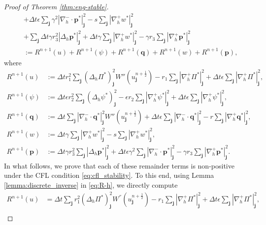 \documentclass[11pt]{article}
\numberwithin{equation}{section}
\newtheorem{counter example}[theorem]{Counter Example}
\numberwithin{equation}{section}
\numberwithin{equation}{section}
\newcommand{\half}{\frac{1}{2}}
\begin{document}
\begin{proof}[Proof of Theorem  \ref{thm:eng-stable}]
\begin{align}
&+\Delta t \epsilon\sum_{\mathbf{j}}\gamma^2|\nabla_h^- \cdot\mathbf{p}^*|_{\mathbf{j}}^2-s\sum_{\mathbf{j}}|\nabla_h^+ w^*|_{\mathbf{j}}^2\nonumber\\
&+\sum_{\mathbf{j}}\Delta t \gamma r_3^2|\Delta_h \mathbf{p}^*|_{\mathbf{j}}^2+\Delta t \gamma\sum_{\mathbf{j}}|\nabla_h^+ w^*|_{\mathbf{j}}^2 -\gamma r_3\sum_{\mathbf{j}}|\nabla_h^{+} \mathbf{p}^*|_{\mathbf{j}}^2\nonumber\\
&:=R^{n+1}(u)+R^{n+1}(\psi)+R^{n+1}(\mathbf q)+R^{n+1}(w)+R^{n+1}(\mathbf p),
\end{align}
where
\begin{align}
R^{n+1}(u)
&:=
\Delta t r_1^2\sum_{\mathbf{j}}(\Delta_h \Pi^*)_{\mathbf{j}}^2W''(u_{\mathbf{j}}^{n+\frac12})
-r_1\sum_{\mathbf{j}}|\nabla_h^+\Pi^*|_{\mathbf{j}}^2
+\Delta t\epsilon\sum_{\mathbf{j}}|\nabla_h^+\Pi^*|_{\mathbf{j}}^2,
\label{eq:R-h}
\\
R^{n+1}(\psi)
&:=
\Delta t\epsilon r_2^2\sum_{\mathbf{j}}(\Delta_h\psi^*)_{\mathbf{j}}^2
-\epsilon r_2\sum_{\mathbf{j}}|\nabla_h^+\psi^*|_{\mathbf{j}}^2
+\Delta t\epsilon\sum_{\mathbf{j}}|\nabla_h^+\psi^*|_{\mathbf{j}}^2,
\label{eq:R-psi}
\\
R^{n+1}(\mathbf q)
&:=
\Delta t\sum_{\mathbf{j}}|\nabla_h^{-}\cdot\mathbf q^*|_{\mathbf{j}}^2W''(u_{\mathbf{j}}^{n+\frac12})
+\Delta t\epsilon\sum_{\mathbf{j}}|\nabla_h^{-}\cdot\mathbf q^*|_{\mathbf{j}}^2
 -r\sum_{\mathbf{j}}|\nabla_h^{+}\mathbf q^*|_{\mathbf{j}}^2,
\label{eq:R-q}
\\
R^{n+1}(w)
&:=
\Delta t\gamma\sum_{\mathbf{j}}|\nabla_h^+w^*|_{\mathbf{j}}^2
-s\sum_{\mathbf{j}}|\nabla_h^+w^*|_{\mathbf{j}}^2,
\label{eq:R-w}
\\
R^{n+1}(\mathbf p)
&:=
\Delta t\gamma r_3^2\sum_{\mathbf{j}}|\Delta_h\mathbf p^*|_{\mathbf{j}}^2
+\Delta t\epsilon\gamma^2\sum_{\mathbf{j}}|\nabla_h^{-}\cdot\mathbf p^*|_{\mathbf{j}}^2
 -\gamma r_3\sum_{\mathbf{j}}|\nabla_h^{+}\mathbf p^*|_{\mathbf{j}}^2 .
\label{eq:R-p}
\end{align}
In what follows, we prove that each of these remainder terms is non-positive under the CFL condition \eqref{eq:cfl_stability}. To this end, using Lemma \ref{lemma:discrete_inverse} in \eqref{eq:R-h}, we directly compute
\begin{equation}
\begin{aligned}
R^{n+1}(u)&=\Delta t \sum_{\mathbf{j}} r_1^2(\Delta_h \Pi^*)_{\mathbf{j}}^2W^{''}(u_{\mathbf{j}}^{n+\half})-r_1\sum_{\mathbf{j}}|\nabla_h^+ \Pi^*|^2_{\mathbf{j}}+\Delta t \epsilon\sum_{\mathbf{j}}|\nabla_h^+ \Pi^*|_{\mathbf{j}}^2,\\

\end{aligned}
\end{equation}
\end{proof}
\end{document}
